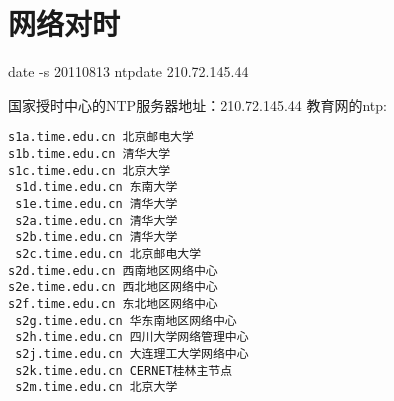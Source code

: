 \section{网络对时}
\begin{shellcmd}
date -s 20110813
ntpdate 210.72.145.44
\end{shellcmd}

国家授时中心的NTP服务器地址：210.72.145.44
教育网的ntp:
\begin{verbatim}
s1a.time.edu.cn 北京邮电大学
s1b.time.edu.cn 清华大学
s1c.time.edu.cn 北京大学
 s1d.time.edu.cn 东南大学
 s1e.time.edu.cn 清华大学
 s2a.time.edu.cn 清华大学
 s2b.time.edu.cn 清华大学
 s2c.time.edu.cn 北京邮电大学
s2d.time.edu.cn 西南地区网络中心
s2e.time.edu.cn 西北地区网络中心
s2f.time.edu.cn 东北地区网络中心
 s2g.time.edu.cn 华东南地区网络中心
 s2h.time.edu.cn 四川大学网络管理中心
 s2j.time.edu.cn 大连理工大学网络中心
 s2k.time.edu.cn CERNET桂林主节点
 s2m.time.edu.cn 北京大学
\end{verbatim}
